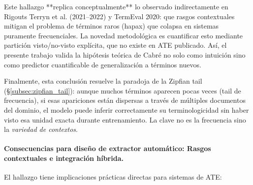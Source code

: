 Este hallazgo **replica conceptualmente** lo observado indirectamente en Rigouts Terryn et al. (2021--2022) y TermEval 2020: que rasgos contextuales mitigan el problema de términos raros (hapax) que colapsa en sistemas puramente frecuenciales. La novedad metodológica es cuantificar esto mediante partición visto/no-visto explícita, que no existe en ATE publicado. Así, el presente trabajo valida la hipótesis teórica de Cabré no solo como intuición sino como predictor cuantificable de generalización a términos nuevos.

Finalmente, esta conclusión resuelve la paradoja de la Zipfian tail (§\ref{subsec:zipfian_tail}): aunque muchos términos aparecen pocas veces (tail de frecuencia), si esas apariciones están dispersas a través de múltiples documentos del dominio, el modelo puede inferir correctamente su terminologicidad sin haber visto esa unidad exacta durante entrenamiento. La clave no es la frecuencia sino la \emph{variedad de contextos}.

\paragraph{Consecuencias para diseño de extractor automático: Rasgos contextuales e integración híbrida.}

El hallazgo tiene implicaciones prácticas directas para sistemas de ATE:

